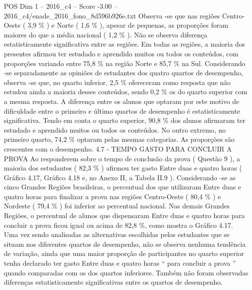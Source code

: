 \begin{textsample}{POS Dim 1 – 2016\_c4 – Score -3.00 – 2016\_c4/enade\_2016\_fono\_8d596b926e.txt}
Observa -se que nas regiões Centro-Oeste ( 3,9 \% ) e Norte ( 1,6 \% ), apesar de pequenas, as proporções foram maiores do que a média nacional ( 1,2 \% ).
Não se observa diferença estatisticamente significativa entre as regiões.
Em todas as regiões, a maioria dos presentes afirmou ter estudado e aprendido muitos ou todos os conteúdos, com proporções variando entre 75,8 \% na região Norte e 85,7 \% na Sul.
Considerando -se separadamente as opiniões de estudantes dos quatro quartos de desempenho, observa -se que, no quarto inferior, 2,5 \% ofereceram como resposta que não estudou ainda a maioria desses conteúdos, sendo 0,2 \% os do quarto superior com a mesma resposta.
A diferença entre os alunos que optaram por este motivo de dificuldade entre o primeiro e último quartos de desempenho é estatisticamente significativa.
Tendo em conta o quarto superior, 90,8 \% dos alunos afirmaram ter estudado e aprendido muitos ou todos os conteúdos.
No outro extremo, no primeiro quarto, 74,2 \% optaram pelas mesmas categorias.
As proporções são crescentes com o desempenho. 4.7 - TEMPO GASTO PARA CONCLUIR A PROVA Ao responderem sobre o tempo de conclusão da prova ( Questão 9 ), a maioria dos estudantes ( 82,3 \% ) afirmou ter gasto Entre duas e quatro horas ( Gráfico 4.17, Gráfico 4.18 e, no Anexo II, a Tabela II.9 ).
Considerando -se as cinco Grandes Regiões brasileiras, o percentual dos que utilizaram Entre duas e quatro horas para finalizar a prova nas regiões Centro-Oeste ( 80,4 \% ) e Nordeste ( 79,4 \% ) foi inferior ao percentual nacional.
Nas demais Grandes Regiões, o percentual de alunos que dispensaram Entre duas e quatro horas para concluir a prova ficou igual ou acima de 82,8 \%, como mostra o Gráfico 4.17.
Uma vez sendo analisadas as alternativas escolhidas pelos estudantes que se situam nos diferentes quartos de desempenho, não se observa nenhuma tendência de variação, ainda que uma maior proporção de participantes no quarto superior tenha declarado ter gasto Entre duas e quatro horas “ para concluir a prova ” quando comparadas com os dos quartos inferiores.
Também não foram observadas diferenças estatisticamente significativas entre os quartos de desempenho.

\end{textsample}
